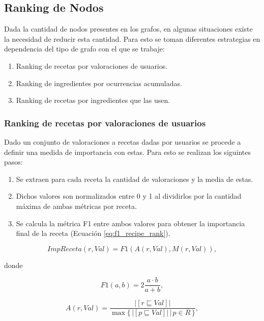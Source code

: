 \documentclass[
	a4paper, %
	10pt, %
	unnumberedsections, %
	twoside, %
]{LTJournalArticle}
\begin{document}
\subsection{Ranking de Nodos}

Dada la cantidad de nodos presentes en los grafos, en algunas situaciones existe la necesidad de reducir esta
cantidad. Para esto se toman diferentes estrategias en dependencia del tipo de grafo con el que se trabaje:

\begin{enumerate}
	\item Ranking de recetas por valoraciones de usuarios.
	\item Ranking de ingredientes por ocurrencias acumuladas.
	\item Ranking de recetas por ingredientes que las usen.
\end{enumerate}

\subsubsection{Ranking de recetas por valoraciones de usuarios}

Dado un conjunto de valoraciones a recetas dadas por usuarios se procede a definir 
una medida de importancia con estas. Para esto se realizan los siguintes pasos:

\begin{enumerate}
	\item Se extraen para cada receta la cantidad de valoraciones y la media de estas.
	\item Dichos valores son normalizados entre 0 y 1 al dividirlos por la cantidad máxima de ambas métricas por receta.
	\item Se calcula la métrica F1 entre ambos valores para obtener la importancia final de la receta (Ecuación \ref{eq:f1_recipe_rank}).
\end{enumerate}

\begin{equation}
	ImpReceta(r, Val) = F1(A(r, Val), M(r, Val)),
	\label{eq:f1_recipe_rank}
\end{equation}

donde

\begin{equation*}
	F1(a, b) = 2 \frac{a · b}{a + b},
\end{equation*}

\begin{equation*}
	A(r, Val) = \frac{|[r \sqsubseteq Val]|}{\max \{\,|[p \sqsubseteq Val]| \, \vert \, p \in R \, \}},
\end{equation*}
\end{document}
